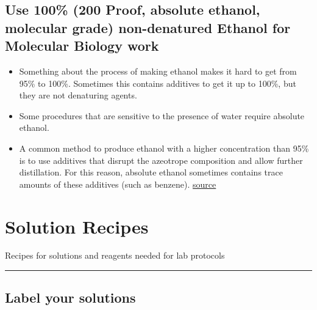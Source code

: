 \documentclass[
  letterpaper,
  DIV=11,
  numbers=noendperiod]{scrreprt}
\begin{document}
\hypertarget{use-100-200-proof-absolute-ethanol-molecular-grade-non-denatured-ethanol-for-molecular-biology-work}{%
\section*{\texorpdfstring{\textbf{Use 100\% (200 Proof, absolute
ethanol, molecular grade) non-denatured Ethanol for Molecular Biology
work}}{Use 100\% (200 Proof, absolute ethanol, molecular grade) non-denatured Ethanol for Molecular Biology work}}\label{use-100-200-proof-absolute-ethanol-molecular-grade-non-denatured-ethanol-for-molecular-biology-work}}

\begin{itemize}
\item
  Something about the process of making ethanol makes it hard to get
  from 95\% to 100\%. Sometimes this contains additives to get it up to
  100\%, but they are not denaturing agents.
\item
  Some procedures that are sensitive to the presence of water require
  absolute ethanol.
\item
  A common method to produce ethanol with a higher concentration than
  95\% is to use additives that disrupt the azeotrope composition and
  allow further distillation. For this reason, absolute ethanol
  sometimes contains trace amounts of these additives (such as benzene).
  \href{https://bitesizebio.com/13518/which-type-of-ethanol-should-i-use/}{source}
\end{itemize}

\hypertarget{solution-recipes}{%
\chapter{Solution Recipes}\label{solution-recipes}}

Recipes for solutions and reagents needed for lab protocols

\begin{center}\rule{0.5\linewidth}{0.5pt}\end{center}

\hypertarget{label-your-solutions}{%
\section*{\texorpdfstring{\textbf{Label your
solutions}}{Label your solutions}}\label{label-your-solutions}}
\end{document}
